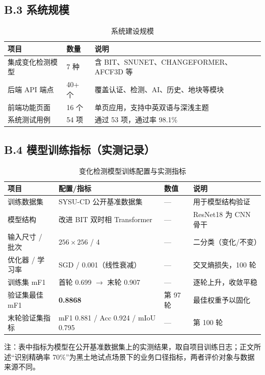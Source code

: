 \subsection{B.3 系统规模}

\begin{table}[htbp]
    \centering
    \caption{系统建设规模}
    \label{tab:scale}
    \small
    \begin{tabular}{|p{5.4cm}|p{2.6cm}|p{6.4cm}|}
        \hline
        \textbf{项目} & \textbf{数量} & \textbf{说明} \\
        \hline
        集成变化检测模型 & 7 种 & 含 BIT、SNUNET、CHANGEFORMER、AFCF3D 等 \\
        \hline
        后端 API 端点 & 40+ 个 & 覆盖认证、检测、AI、历史、地块等模块 \\
        \hline
        前端功能页面 & 16 个 & 单页应用，支持中英双语与深浅主题 \\
        \hline
        系统测试用例 & 54 项 & 通过 53 项，通过率 98.1\% \\
        \hline
    \end{tabular}
\end{table}

\subsection{B.4 模型训练指标（实测记录）}

\begin{table}[htbp]
    \centering
    \caption{变化检测模型训练配置与实测指标}
    \label{tab:train}
    \small
    \begin{tabular}{|p{3.4cm}|p{4.6cm}|p{2.4cm}|p{4.0cm}|}
        \hline
        \textbf{项目} & \textbf{配置/指标} & \textbf{数值} & \textbf{说明} \\
        \hline
        训练数据集 & SYSU-CD 公开基准数据集 & — & 用于模型结构验证 \\
        \hline
        模型结构 & 改进 BIT 双时相 Transformer & — & ResNet18 为 CNN 骨干 \\
        \hline
        输入尺寸 / 批次 & $256 \times 256$ / 4 & — & 二分类（变化/不变） \\
        \hline
        优化器 / 学习率 & SGD / 0.001（线性衰减） & — & 交叉熵损失，100 轮 \\
        \hline
        训练集 mF1 & 首轮 0.699 $\rightarrow$ 末轮 0.907 & — & 逐轮上升，收敛平稳 \\
        \hline
        验证集最佳 mF1 & \textbf{0.8868} & 第 97 轮 & 最佳权重予以固化 \\
        \hline
        末轮验证集指标 & mF1 0.881 / Acc 0.924 / mIoU 0.795 & — & 第 100 轮 \\
        \hline
    \end{tabular}
    \par\vspace{2pt}
    {\footnotesize 注：表中指标为模型在公开基准数据集上的实测结果，取自项目训练日志；正文所述“识别精确率 70\%”为黑土地试点场景下的业务口径指标，两者评价对象与数据来源不同。}
\end{table}

